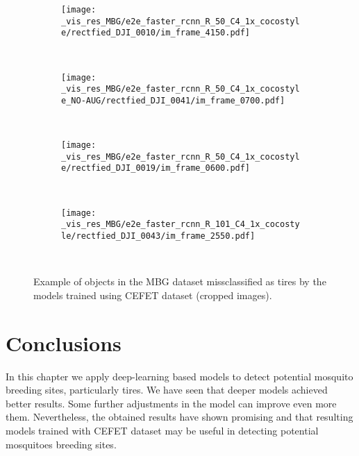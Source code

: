 \begin{figure}[th!]
  \centering
  \begin{subfigure}[t]{.49\linewidth}
    \centering
    \texttt{[image: \_vis\_res\_MBG/e2e\_faster\_rcnn\_R\_50\_C4\_1x\_cocostyle/rectfied\_DJI\_0010/im\_frame\_4150.pdf]}
    \label{fig:mbg_res_50N}
  \end{subfigure}~
  \begin{subfigure}[t]{0.49\linewidth}
    \centering
    \texttt{[image: \_vis\_res\_MBG/e2e\_faster\_rcnn\_R\_50\_C4\_1x\_cocostyle\_NO-AUG/rectfied\_DJI\_0041/im\_frame\_0700.pdf]}
    \label{fig:mbg_res_101}
  \end{subfigure}
  \\
  \vspace{-12mm}
  \begin{subfigure}[t]{0.49\linewidth}
    \centering
    \texttt{[image: \_vis\_res\_MBG/e2e\_faster\_rcnn\_R\_50\_C4\_1x\_cocostyle/rectfied\_DJI\_0019/im\_frame\_0600.pdf]}
    \label{fig:mbg_res_50}
  \end{subfigure}~
  \begin{subfigure}[t]{0.49\linewidth}
    \centering
    \texttt{[image: \_vis\_res\_MBG/e2e\_faster\_rcnn\_R\_101\_C4\_1x\_cocostyle/rectfied\_DJI\_0043/im\_frame\_2550.pdf]}
    \label{fig:mbg_res_101}
  \end{subfigure}\\
  \caption{Example of objects in the MBG dataset missclassified as tires by the models trained using CEFET dataset (cropped images).}
  \label{fig:mbg_res_fp}
\end{figure}


\section{Conclusions}
%
In this chapter we apply deep-learning based models to detect potential mosquito breeding sites, particularly tires.
We have seen that deeper models achieved better results.
Some further adjustments in the model can improve even more them.
Nevertheless, the obtained results have shown promising and that resulting models trained with CEFET dataset may be useful in detecting potential mosquitoes breeding sites.










